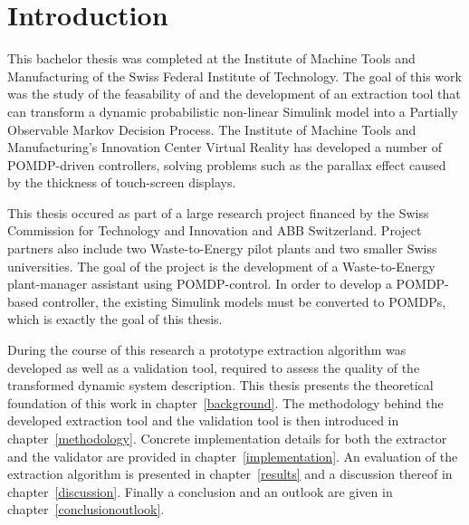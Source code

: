 \setcounter{chapter}{0}

\chapter{Introduction}

This bachelor thesis was completed at the Institute of Machine Tools and Manufacturing of the Swiss Federal Institute of Technology. The goal of this work was the study of the feasability of and the development of an extraction tool that can transform a dynamic probabilistic non-linear Simulink model into a Partially Observable Markov Decision Process. The Institute of Machine Tools and Manufacturing's Innovation Center Virtual Reality has developed a number of POMDP-driven controllers, solving problems such as the parallax effect caused by the thickness of touch-screen displays.

This thesis occured as part of a large research project financed by the Swiss Commission for Technology and Innovation and ABB Switzerland. Project partners also include two Waste-to-Energy pilot plants and two smaller Swiss universities. The goal of the project is the development of a Waste-to-Energy plant-manager assistant using POMDP-control. In order to develop a POMDP-based controller, the existing Simulink models must be converted to POMDPs, which is exactly the goal of this thesis.

During the course of this research a prototype extraction algorithm was developed as well as a validation tool, required to assess the quality of the transformed dynamic system description. This thesis presents the theoretical foundation of this work in chapter~\ref{background}. The methodology behind the developed extraction tool and the validation tool is then introduced in chapter~\ref{methodology}. Concrete implementation details for both the extractor and the validator are provided in chapter~\ref{implementation}. An evaluation of the extraction algorithm is presented in chapter~\ref{results} and a discussion thereof in chapter~\ref{discussion}. Finally a conclusion and an outlook are given in chapter~\ref{conclusionoutlook}.
